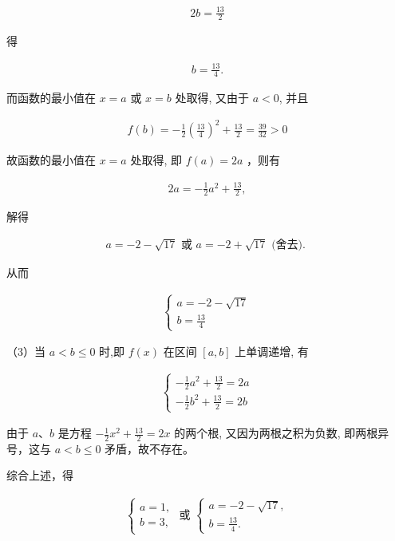 \documentclass[10pt]{article}
\begin{document}
\begin{align*}
2 b=\frac{13}{2}
\end{align*}

得

\begin{align*}
b=\frac{13}{4} .
\end{align*}

而函数的最小值在 $x=a$ 或 $x=b$ 处取得, 又由于 $a<0$, 并且

\begin{align*}
f(b)=-\frac{1}{2}\left(\frac{13}{4}\right)^{2}+\frac{13}{2}=\frac{39}{32}>0
\end{align*}

故函数的最小值在 $x=a$ 处取得, 即 $f(a)=2 a$ ，则有

\begin{align*}
2 a=-\frac{1}{2} a^{2}+\frac{13}{2},
\end{align*}

解得

\begin{align*}
a=-2-\sqrt{17} \text { 或 } a=-2+\sqrt{17} \text { (舍去). }
\end{align*}

从而

\begin{align*}
\left\{\begin{array}{l}
a=-2-\sqrt{17} \\
b=\frac{13}{4}
\end{array}\right.
\end{align*}

（3）当 $a<b \leqslant 0$ 时,即 $f(x)$ 在区间 $[a, b]$ 上单调递增, 有

\begin{align*}
\left\{\begin{array}{l}
-\frac{1}{2} a^{2}+\frac{13}{2}=2 a \\
-\frac{1}{2} b^{2}+\frac{13}{2}=2 b
\end{array}\right.
\end{align*}

由于 $a 、 b$ 是方程 $-\frac{1}{2} x^{2}+\frac{13}{2}=2 x$ 的两个根, 又因为两根之积为负数, 即两根异号，这与 $a<b \leqslant 0$ 矛盾，故不存在。

综合上述，得

\begin{align*}
\left\{\begin{array} { l } 
{ a = 1 , } \\
{ b = 3 , }
\end{array} \text { 或 } \left\{\begin{array}{l}
a=-2-\sqrt{17}, \\
b=\frac{13}{4} .
\end{array}\right.\right.
\end{align*}
\end{document}
